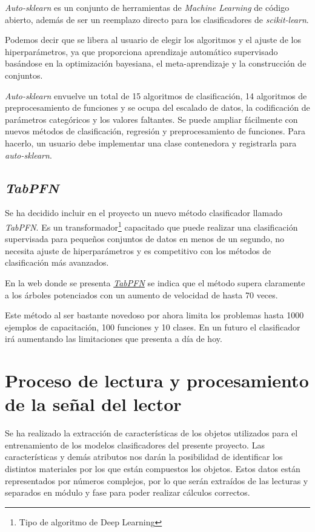 \textit{Auto-sklearn} es un conjunto de herramientas de \textit{Machine Learning} de código abierto, además de ser un reemplazo directo para los clasificadores de \textit{scikit-learn}.\cite{auto-sklearn} 

Podemos decir que se libera al usuario de elegir los algoritmos y el ajuste de los hiperparámetros, ya que proporciona aprendizaje automático supervisado basándose en la optimización bayesiana, el meta-aprendizaje y la construcción de conjuntos.

\textit{Auto-sklearn} envuelve un total de 15 algoritmos de clasificación, 14 algoritmos de preprocesamiento de funciones y se ocupa del escalado de datos, la codificación de parámetros categóricos y los valores faltantes. Se puede ampliar fácilmente con nuevos métodos de clasificación, regresión y preprocesamiento de funciones. Para hacerlo, un usuario debe implementar una clase contenedora y registrarla para \textit{auto-sklearn}.

\subsection{\textit{TabPFN}}

Se ha decidido incluir en el proyecto un nuevo método clasificador llamado \textit{TabPFN}. Es un transformador\footnote{Tipo de algoritmo de Deep Learning}\cite{Lopez2020Feb} capacitado que puede realizar una clasificación supervisada para pequeños conjuntos de datos en menos de un segundo, no necesita ajuste de hiperparámetros y es competitivo con los métodos de clasificación más avanzados.

En la web donde se presenta \href{https://www.automl.org/tabpfn-a-transformer-that-solves-small-tabular-classification-problems-in-a-second/}{\textit{TabPFN}} se indica que el método supera claramente a los árboles potenciados con un aumento de velocidad de hasta 70 veces.

Este método al ser bastante novedoso por ahora limita los problemas hasta 1000 ejemplos de capacitación, 100 funciones y 10 clases. En un futuro el clasificador irá aumentando las limitaciones que presenta a día de hoy.

\section{Proceso de lectura y procesamiento de la señal del lector}

Se ha realizado la extracción de características de los objetos utilizados para el entrenamiento de los modelos clasificadores del presente proyecto. Las características y demás atributos nos darán la posibilidad de identificar los distintos materiales por los que están compuestos los objetos. Estos datos están representados por números complejos, por lo que serán extraídos de las lecturas y separados en módulo y fase para poder realizar cálculos correctos.

